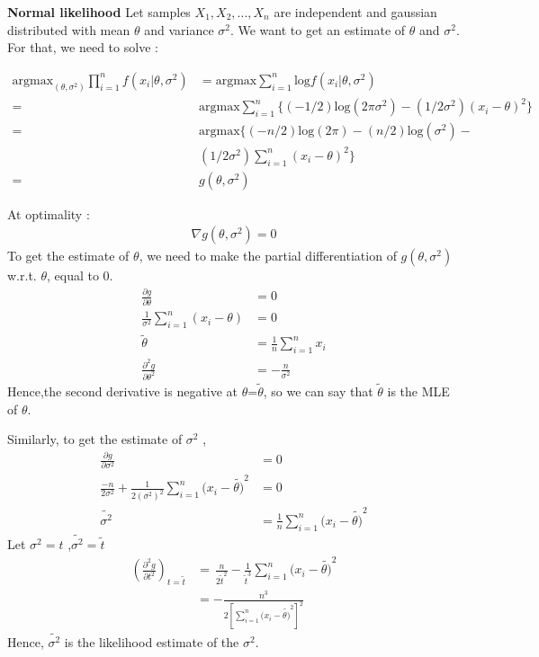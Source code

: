 \documentclass[a4paper,english,12pt]{article}
\begin{document}
\begin{exmp}\textbf{Normal likelihood}
Let samples $X_1,X_2,...,X_n$ are independent and gaussian distributed with mean $\theta$ and variance $\sigma^2$. We want to get an estimate of $\theta$ and $\sigma^2$. For that, we need to solve :

\begin{align}
\mathrm{argmax}_{(\theta,\sigma^2)}\prod\limits_{i=1}^n f(x_i|\theta,\sigma^2)&= \mathrm{argmax}\sum\limits_{i=1}^n \mathrm{log} f(x_i|\theta,\sigma^2)\\
 =&\mathrm{argmax}\sum\limits_{i=1}^n\{(-1/2)\mathrm{log}(2\pi\sigma^2)-(1/2\sigma^2)(x_i-\theta)^2\}\nonumber\\
=&\mathrm{argmax}\{(-n/2)\mathrm{log}(2\pi)-(n/2)\mathrm{log}(\sigma^2)-\nonumber\\
&(1/2\sigma^2)\sum\limits_{i=1}^n(x_i-\theta)^2\}\nonumber\\
=&g(\theta,\sigma^2)
\end{align}


At optimality : 
\begin{align}
\nabla{g}(\theta,\sigma^2)=0
\end{align} 
To get the estimate of $\theta$, we need to make the partial differentiation of ${g}(\theta,\sigma^2)$ w.r.t. $\theta$, equal to 0.
\begin{align}
\frac{\partial g}{\partial \theta}&=0\\
\frac{1}{\sigma^2}\sum\limits_{i=1}^n(x_i-\theta)&=0\\
\tilde{\theta}&=\frac{1}{n}\sum\limits_{i=1}^n x_i\\
\frac{\partial^2 g}{\partial \theta^2}&=-\frac{n}{\sigma^2}
\end{align}
Hence,the second derivative is negative at $\theta$=$\tilde{\theta}$, so we can say that
 $\tilde{\theta}$ is the MLE of $\theta$.

Similarly, to get the estimate of $\sigma^2$ ,
\begin{align}
\frac{\partial g}{\partial \sigma^2}&=0\\
\frac{-n}{2\sigma^2}+\frac{1}{2(\sigma^2)^2}\sum\limits_{i=1}^n(x_i-\tilde{\theta)}^2&=0\nonumber\\
\tilde{\sigma^2}&=\frac{1}{n}\sum\limits_{i=1}^n(x_i-\tilde{\theta)}^2
\end{align}
Let $\sigma^2=t$ ,$\tilde{\sigma^2}=\tilde{t}$
\begin{align}
{\left(\frac{\partial^2 g}{\partial t^2}\right)}_{t=\tilde{t}}&=\, \frac{n}{2\tilde{t}^2}-\frac{1}{\tilde{t}^3}\sum\limits_{i=1}^n(x_i-\tilde{\theta)}^2\\
&=-\frac{n^3}{2\left[\sum\limits_{i=1}^n(x_i-\tilde{\theta)}^2\right]^2}
\end{align}
Hence, $\tilde{\sigma^2}$ is the likelihood estimate of the $\sigma^2$.

\end{exmp}
\end{document}
